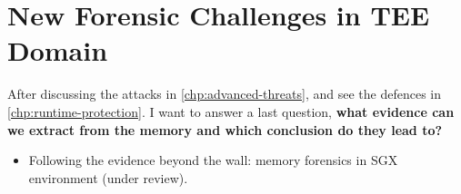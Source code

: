 \chapter{New Forensic Challenges in TEE Domain}
\label{chp:forensic}

After discussing the attacks in \ref{chp:advanced-threats}, and see the 
defences in \ref{chp:runtime-protection}.
I want to answer a last question, \textbf{what evidence can we extract from the 
memory and which conclusion do they lead to?}

\begin{itemize}
	\item Following the evidence beyond the wall: memory forensics in SGX
	environment (under review).
\end{itemize}